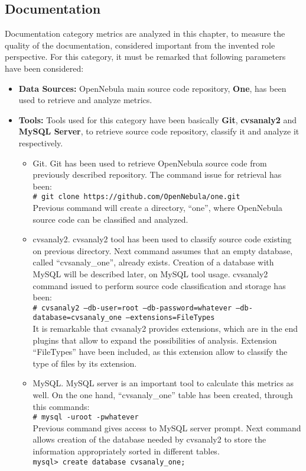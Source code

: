 \documentclass[11pt]{article}
\newcommand{\shellcmd}[1]{\\\indent\indent\texttt{\# #1}\\}
\newcommand{\mysqlcmd}[1]{\\\indent\indent\texttt{mysql> #1}\\}
\begin{document}
\subsection{Documentation}\label{sec:analysis_documentation}
Documentation category metrics are analyzed in this chapter, to measure the quality of the documentation, considered important from the invented role perspective. For this category, it must be remarked that following parameters have been considered:
\begin{itemize}\itemsep0pt
\item{\textbf{Data Sources:}} OpenNebula main source code repository, \textbf{One}, has been used to retrieve and analyze metrics. 
\item{\textbf{Tools:}} Tools used for this category have been basically \textbf{Git}, \textbf{cvsanaly2} and \textbf{MySQL Server}, to retrieve source code repository, classify it and analyze it respectively.
\begin{itemize}\itemsep0pt
\item{Git.} Git has been used to retrieve OpenNebula source code from previously described repository. The command issue for retrieval has been:
\shellcmd{git clone https://github.com/OpenNebula/one.git}
Previous command will create a directory, ``one'', where OpenNebula source code can be classified and analyzed.
\item{cvsanaly2.} cvsanaly2 tool has been used to classify source code existing on previous directory. Next command assumes that an empty database, called ``cvsanaly\_one'', already exists. Creation of a database with MySQL will be described later, on MySQL tool usage. cvsanaly2 command issued to perform source code classification and storage has been:
\shellcmd{cvsanaly2 --db-user=root --db-password=whatever --db-database=cvsanaly\_one --extensions=FileTypes}
It is remarkable that cvsanaly2 provides extensions, which are in the end plugins that allow to expand the possibilities of analysis. Extension ``FileTypes'' have been included, as this extension allow to classify the type of files by its extension.
\item{MySQL.} MySQL server is an important tool to calculate this metrics as well. On the one hand, ``cvsanaly\_one'' table has been created, through this commands:
\shellcmd{mysql -uroot -pwhatever}
Previous command gives access to MySQL server prompt. Next command allows creation of the database needed by cvsanaly2 to store the information appropriately sorted in different tables.
\mysqlcmd{create database cvsanaly\_one;}

\end{itemize}
\end{itemize}
\end{document}
